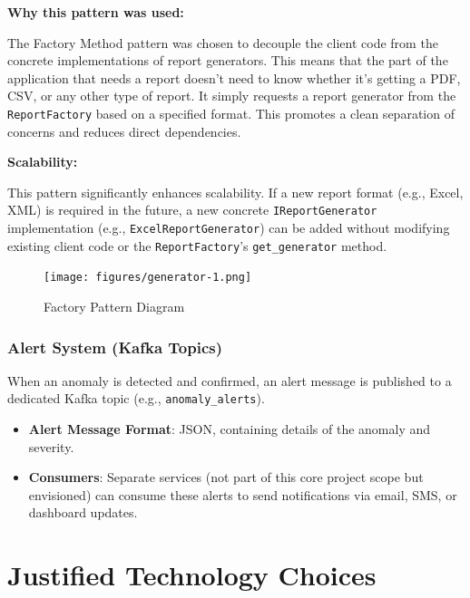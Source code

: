 \textbf{Why this pattern was used:}

The Factory Method pattern was chosen to decouple the client code from the concrete implementations of report generators. This means that the part of the application that needs a report doesn't need to know whether it's getting a PDF, CSV, or any other type of report. It simply requests a report generator from the \texttt{ReportFactory} based on a specified format. This promotes a clean separation of concerns and reduces direct dependencies.

\textbf{Scalability:}

This pattern significantly enhances scalability. If a new report format (e.g., Excel, XML) is required in the future, a new concrete \texttt{IReportGenerator} implementation (e.g., \texttt{ExcelReportGenerator}) can be added without modifying existing client code or the \texttt{ReportFactory}'s \texttt{get\_generator} method.

\begin{figure}[!htb]
    \centering
    \texttt{[image: figures/generator-1.png]}
    \caption{Factory Pattern Diagram}
    \label{fig:factory_pattern_diagram}
\end{figure}
 




\subsubsection{Alert System (Kafka Topics)}

When an anomaly is detected and confirmed, an alert message is published to a dedicated Kafka topic (e.g., \texttt{anomaly\_alerts}).
\begin{itemize}
    \item \textbf{Alert Message Format}: JSON, containing details of the anomaly and severity.
    \item \textbf{Consumers}: Separate services (not part of this core project scope but envisioned) can consume these alerts to send notifications via email, SMS, or dashboard updates.
\end{itemize}
\section{Justified Technology Choices}

